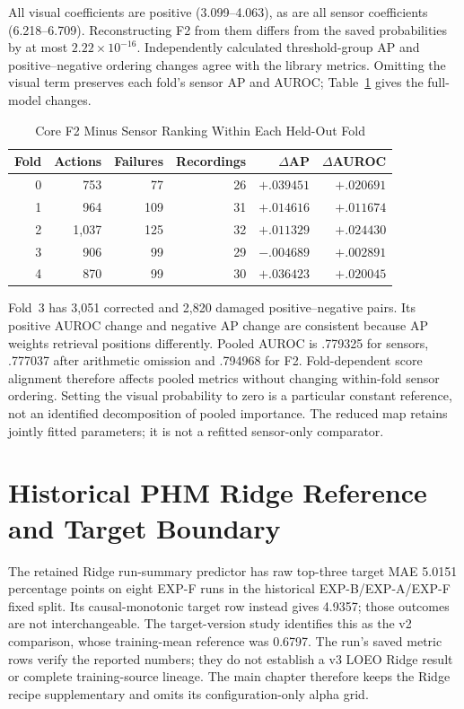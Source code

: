 All visual coefficients are positive (3.099--4.063), as are all sensor coefficients
(6.218--6.709). Reconstructing F2 from them differs from the saved probabilities by at
most $2.22\times10^{-16}$. Independently calculated threshold-group AP and
positive--negative ordering changes agree with the library metrics. Omitting the visual
term preserves each fold's sensor AP and AUROC; Table~\ref{tab:f2-fold-audit} gives the
full-model changes.

\begin{table}[htbp]
\caption{Core F2 Minus Sensor Ranking Within Each Held-Out Fold}\label{tab:f2-fold-audit}
\centering\small
\begin{tabular}{rrrrrr}\toprule
Fold & Actions & Failures & Recordings & $\Delta$AP & $\Delta$AUROC\\\midrule
0 & 753 & 77 & 26 & $+.039451$ & $+.020691$\\
1 & 964 & 109 & 31 & $+.014616$ & $+.011674$\\
2 & 1,037 & 125 & 32 & $+.011329$ & $+.024430$\\
3 & 906 & 99 & 29 & $-.004689$ & $+.002891$\\
4 & 870 & 99 & 30 & $+.036423$ & $+.020045$\\\bottomrule
\end{tabular}
\end{table}
Fold~3 has 3,051 corrected and 2,820 damaged positive--negative pairs. Its positive
AUROC change and negative AP change are consistent because AP weights retrieval
positions differently. Pooled AUROC is .779325 for sensors, .777037 after arithmetic
omission and .794968 for F2. Fold-dependent score alignment therefore affects pooled
metrics without changing within-fold sensor ordering. Setting the visual probability to
zero is a particular constant reference, not an identified decomposition of pooled
importance. The reduced map retains jointly fitted parameters; it is not a refitted
sensor-only comparator.

\section{Historical PHM Ridge Reference and Target Boundary}
\label{sec:phm-ridge-supplement}
The retained Ridge run-summary predictor has raw top-three target MAE 5.0151 percentage
points on eight EXP-F runs in the historical EXP-B/EXP-A/EXP-F fixed split. Its
causal-monotonic target row instead gives 4.9357; those outcomes are not interchangeable.
The target-version study identifies this as the v2 comparison, whose training-mean
reference was 0.6797. The run's saved metric rows verify the reported numbers; they do
not establish a v3 LOEO Ridge result or complete training-source lineage. The main
chapter therefore keeps the Ridge recipe supplementary and omits its configuration-only
alpha grid.

